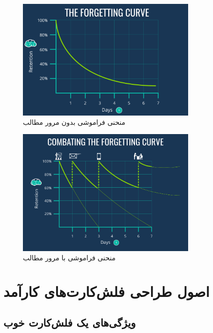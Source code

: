 \documentclass[12pt]{report}
\begin{document}
\begin{figure}[h!]
  \centering
  \includegraphics[width=0.8\textwidth]{images/forgetting-curve.png}
  \caption{منحنی فراموشی بدون مرور مطالب}
  \label{fig:forgetting-curve}
\end{figure}

\begin{figure}[h!]
  \centering
  \includegraphics[width=0.8\textwidth]{images/forgetting-curve-with-repetition.png}
  \caption{منحنی فراموشی با مرور مطالب}
  \label{fig:forgetting-curve-with-repetition}
\end{figure}

\chapter{اصول طراحی فلش‌کارت‌های کارآمد}


\section{ویژگی‌های یک فلش‌کارت خوب}
\end{document}
